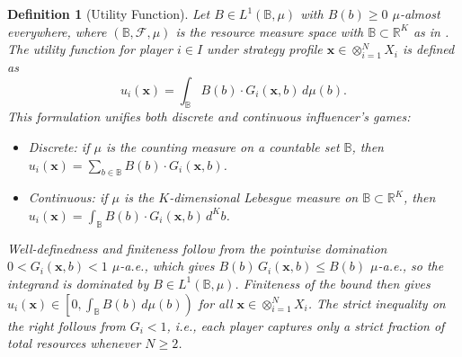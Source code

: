 \documentclass{article}
\newtheorem{definition}{Definition}
\begin{document}
                \begin{definition}[Utility Function]\label{def:SI_utility_function}
                    Let $B \in L^1(\mathbb{B}, \mu)$ with $B(b) \geq 0$ $\mu$-almost everywhere, 
                    where $(\mathbb{B}, \mathcal{F}, \mu)$ is the resource measure space with 
                    $\mathbb{B} \subset \mathbb{R}^K$ as in . The utility function 
                    for player $i \in I$ under strategy profile $\mathbf{x} \in \otimes_{i=1}^N X_i$ is 
                    defined as
                    \begin{equation}\label{eq:SI_utility}
                        u_{i}(\mathbf{x}) = \int_{\mathbb{B}} B(b) \cdot G_i(\mathbf{x},b) \, d\mu(b).
                    \end{equation}
                    This formulation unifies both discrete and continuous influencer's games:
                    \begin{itemize}
                        \item Discrete: if $\mu$ is the counting measure on a countable set 
                        $\mathbb{B}$, then $u_i(\mathbf{x}) = \sum_{b \in \mathbb{B}} B(b) \cdot 
                        G_i(\mathbf{x}, b)$.
                        \item Continuous: if $\mu$ is the $K$-dimensional Lebesgue measure 
                        on $\mathbb{B} \subset \mathbb{R}^K$, then $u_i(\mathbf{x}) = \int_{\mathbb{B}} 
                        B(b) \cdot G_i(\mathbf{x},b) \, d^K b$.
                    \end{itemize}
                    Well-definedness and finiteness follow from the pointwise domination 
                    $0 < G_i(\mathbf{x},b) < 1$ $\mu$-a.e., which gives 
                    $B(b)\,G_i(\mathbf{x},b) \leq B(b)$ $\mu$-a.e., so the integrand is dominated 
                    by $B \in L^1(\mathbb{B},\mu)$. Finiteness of the bound then gives 
                    $u_i(\mathbf{x}) \in \left[0, \int_{\mathbb{B}} B(b)\,d\mu(b)\right)$ 
                    for all $\mathbf{x} \in \otimes_{i=1}^N X_i$. The strict inequality on the right 
                    follows from $G_i < 1$, i.e., each player captures only a strict fraction of 
                    total resources whenever $N \geq 2$.
                \end{definition}
                
\end{document}
